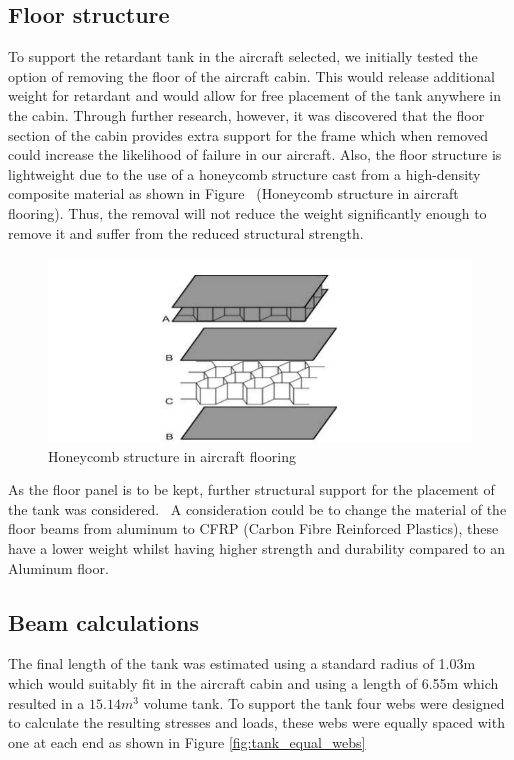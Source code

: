 \subsection{Floor structure}

To support the retardant tank in the aircraft selected, we initially tested the option of removing the floor of the aircraft cabin. This would release additional weight for retardant and would allow for free placement of the tank anywhere in the cabin. Through further research, however, it was discovered that the floor section of the cabin provides extra support for the frame which when removed could increase the likelihood of failure in our aircraft. Also, the floor structure is lightweight due to the use of a honeycomb structure cast from a high-density composite material as shown in Figure  (Honeycomb structure in aircraft flooring). Thus, the removal will not reduce the weight significantly enough to remove it and suffer from the reduced structural strength. 

\begin{figure}[!htbp]
\centering
\includegraphics[width= \linewidth]{../figures/honeycomb_structure_in_aircraft_flooring.jpg}
\caption{Honeycomb structure in aircraft flooring}
\label{fig:honeycomb_structure_in_aircraft_flooring}
\end{figure}
\FloatBarrier

As the floor panel is to be kept, further structural support for the placement of the tank was considered.  A consideration could be to change the material of the floor beams from aluminum to CFRP (Carbon Fibre Reinforced Plastics), these have a lower weight whilst having higher strength and durability compared to an Aluminum floor. 

\subsection{Beam calculations}
The final length of the tank was estimated using a standard radius of 1.03m which would suitably fit in the aircraft cabin and using a length of 6.55m which resulted in a $15.14 m^3$ volume tank. To support the tank four webs were designed to calculate the resulting stresses and loads, these webs were equally spaced with one at each end as shown in Figure \ref{fig:tank_equal_webs}


